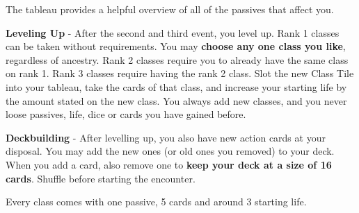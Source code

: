 \begin{tcolorbox}[colframe=black, colback=white]
	The tableau provides a helpful overview of all of the passives that affect you.
\end{tcolorbox}


\textbf{Leveling Up} - After the second and third event, you level up.
Rank 1 classes can be taken without requirements. You may \textbf{choose any one class you like}, regardless of ancestry. Rank 2 classes require you to already have the same class on rank 1. Rank 3 classes require having the rank 2 class. Slot the new Class Tile into your tableau, take the cards of that class, and increase your starting life by the amount stated on the new class. You always add new classes, and you never loose passives, life, dice or cards you have gained before.

\textbf{Deckbuilding} - After levelling up, you also have new action cards at your disposal. You may add the new ones (or old ones you removed) to your deck. When you add a card, also remove one to \textbf{keep your deck at a size of 16 cards}. Shuffle before starting the encounter.

\begin{tcolorbox}[colframe=black, colback=white]
	Every class comes with one passive, 5 cards and around 3 starting life.
\end{tcolorbox}


